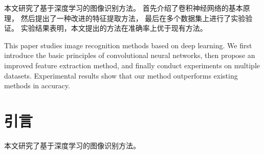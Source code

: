 \documentclass[degree=master, professional]{sduthesis}
\begin{document}
\MakeCover

\begin{cnabstract}
  本文研究了基于深度学习的图像识别方法。
  首先介绍了卷积神经网络的基本原理，
  然后提出了一种改进的特征提取方法，
  最后在多个数据集上进行了实验验证。
  实验结果表明，本文提出的方法在准确率上优于现有方法。
\end{cnabstract}

\begin{enabstract}
  This paper studies image recognition methods based on deep learning.
  We first introduce the basic principles of convolutional neural networks,
  then propose an improved feature extraction method,
  and finally conduct experiments on multiple datasets.
  Experimental results show that our method outperforms existing methods in accuracy.
\end{enabstract}

\tableofcontents

\chapter{引言}
本文研究了基于深度学习的图像识别方法。

\nocite{*}


\MakeDeclaration
\end{document}
